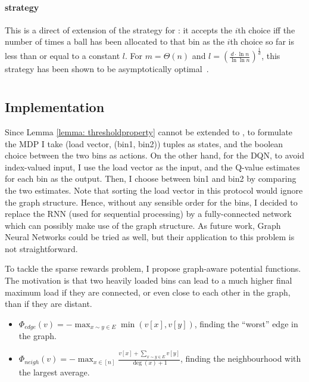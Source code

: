\paragraph{\Threshold strategy} This is a direct of extension of the \Threshold strategy for \TwoThinning: it accepts the $i$th choice iff the number of times a ball has been allocated to that bin as the $i$th choice so far is less than or equal to a constant $l$. For $m=\Theta(n)$ and $l=\left(\frac{d\cdot\ln n}{\ln\ln n}\right)^{\frac{1}{d}}$, this strategy has been shown to be asymptotically optimal~\cite{feldheim2020dthinning}.


\section{\GraphicalTwoChoice}


\subsection{\DQL Implementation} \label{dqn-implmentation-graphical-two-choice}

Since Lemma \ref{lemma: thresholdproperty} cannot be extended to \GraphicalTwoChoice, to formulate the MDP I take (load vector, (bin1, bin2)) tuples as states, and the boolean choice between the two bins as actions. On the other hand, for the DQN, to avoid index-valued input, I use the load vector as the input, and the Q-value estimates for each bin as the output. Then, I choose between bin1 and bin2 by comparing the two estimates. Note that sorting the load vector in this protocol would ignore the graph structure. Hence, without any sensible order for the bins, I decided to replace the RNN (used for sequential processing) by a fully-connected network which can possibly make use of the graph structure. As future work, Graph Neural Networks \cite{scarselli2009GNN} could be tried as well, but their application to this problem is not straightforward.



To tackle the sparse rewards problem, I propose graph-aware potential functions. The motivation is that two heavily loaded bins can lead to a much higher final maximum load if they are connected, or even close to each other in the graph, than if they are distant.


\begin{itemize}
    \item 
    $\Phi_{edge}(v)=-\max_{x\sim y \in E} \min(v[x], v[y])$, finding the ``worst'' edge in the graph.
    \item
    $\Phi_{neigh}(v)=-\max_{x \in [n]} \frac{v[x]+\sum_{x\sim y \in E}v[y]}{\deg(x)+1}$, finding the neighbourhood with the largest average.
\end{itemize}


